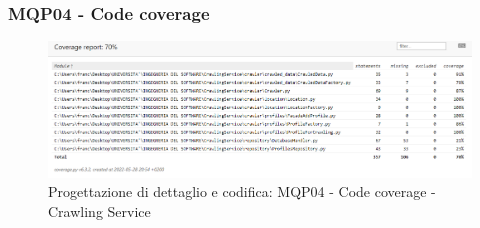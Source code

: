 \subsubsection{MQP04 - Code coverage}
\begin{figure}[H]
    \centering
    \includegraphics[scale=0.50]{Sezioni/images/pb_prodotto/coverage-CS.PNG}
    \caption{Progettazione di dettaglio e codifica: MQP04 - Code coverage - Crawling Service}
\end{figure}

